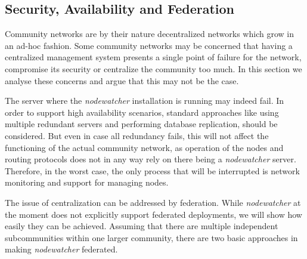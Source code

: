 \documentclass[5p,sort&compress]{elsarticle}
\newcommand{\nodewatcher}{\textit{nodewatcher}}
\begin{document}
\subsection{Security, Availability and Federation}

Community networks are by their nature decentralized networks which grow in an ad-hoc fashion.
Some community networks may be concerned that having a centralized management system presents a single point of failure for the network, compromise its security or centralize the community too much.
In this section we analyse these concerns and argue that this may not be the case.

The server where the \nodewatcher{} installation is running may indeed fail.
In order to support high availability scenarios, standard approaches like using multiple redundant servers and performing database replication, should be considered.
But even in case all redundancy fails, this will not affect the functioning of the actual community network, as operation of the nodes and routing protocols does not in any way rely on there being a \nodewatcher{} server.
Therefore, in the worst case, the only process that will be interrupted is network monitoring and support for managing nodes.

The issue of centralization can be addressed by federation. 
While \nodewatcher{} at the moment does not explicitly support federated deployments, we will show how easily they can be achieved.
Assuming that there are multiple independent subcommunities within one larger community, there are two basic approaches in making \nodewatcher{} federated.
\end{document}
